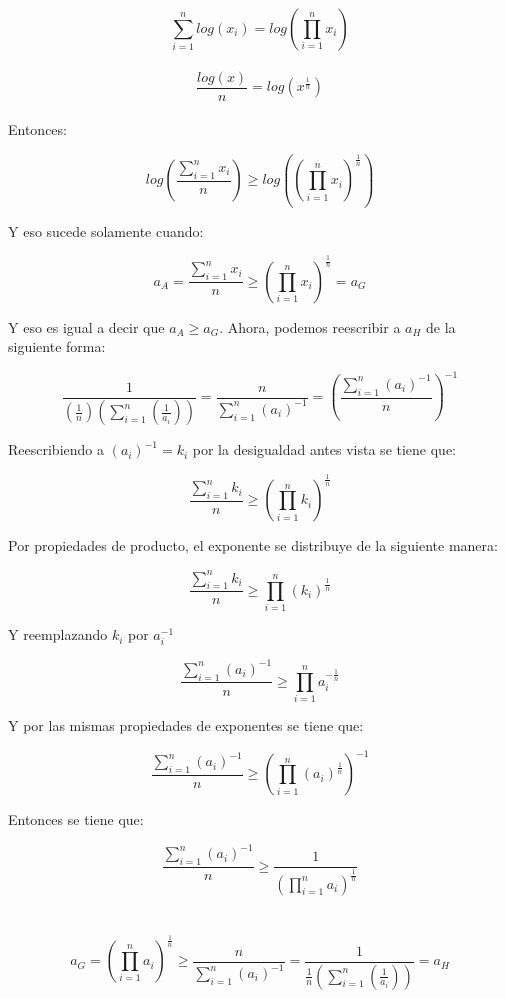 \documentclass[12pt,a4paper]{report}
\begin{document}
\begin{enumerate}
{		   $$\sum_{i=1}^{n}log(x_{i})=log(\prod_{i=1}^{n}x_{i})$$ \\
		      $$\frac{log(x)}{n}=log(x^{\frac{1}{n}})$$\\
		      Entonces:\\
		      \begin{center}
		     $$log(\frac{\sum_{i=1}^{n}x_{i}}{n})\geq log((\prod_{i=1}^{n}x_{i})^{\frac{1}{n}})
		      $$\end{center}
		      Y eso sucede solamente cuando:\\
		      \begin{center}
		          $$a_{A}=\frac{\sum_{i=1}^{n}x_{i}}{n} \geq (\prod_{i=1}^{n}x_{i})^{\frac{1}{n}}=a_{G}$$
		      \end{center}
		      Y eso es igual a decir que $a_{A}\geq a_{G}$. Ahora, podemos reescribir a $a_{H}$ de la siguiente forma:\\
		      \begin{center}
		          $$\frac{1}{(\frac{1}{n})(\sum_{i=1}^{n}(\frac{1}{a_{i}}))}=\frac{n}{\sum_{i=1}^{n}(a_{i})^{-1}}=(\frac{\sum_{i=1}^{n}(a_{i})^{-1}}{n})^{-1}$$
		      \end{center}
		      Reescribiendo a $(a_{i})^{-1}=k_{i}$ por la desigualdad antes vista se tiene que:\\
		      \begin{center}
		          $$\frac{\sum_{i=1}^{n}k_{i}}{n}\geq (\prod_{i=1}^{n}k_{i})^{\frac{1}{n}}$$
		      \end{center}
		      Por propiedades de producto, el exponente se distribuye de la siguiente manera:\\
		      \begin{center}
		          $$\frac{\sum_{i=1}^{n}k_{i}}{n}\geq \prod_{i=1}^{n}(k_{i})^{\frac{1}{n}}$$
		      \end{center}
		      Y reemplazando $k_{i}$ por $a_{i}^{-1}$\\
		      \begin{center}
		          $$\frac{\sum_{i=1}^{n}(a_{i})^{-1}}{n} \geq \prod_{i=1}^{n}a_{i}^{-\frac{1}{n}}$$
		      \end{center}
		      Y por las mismas propiedades de exponentes se tiene que:\\
		      \begin{center}
		          $$\frac{\sum_{i=1}^{n}(a_{i})^{-1}}{n}\geq (\prod_{i=1}^{n}(a_{i})^{\frac{1}{n}})^{-1}$$
		      \end{center}

		      Entonces se tiene que:\\
		      \begin{center}
		          $$\frac{\sum_{i=1}^{n}(a_{i})^{-1}}{n}\geq \frac{1}{(\prod_{i=1}^{n}a_{i})^{\frac{1}{n}}}$$\\ \\
		          $$a_{G}=(\prod_{i=1}^{n}a_{i})^{\frac{1}{n}}\geq \frac{n}{\sum_{i=1}^{n}(a_{i})^{-1}}=\frac{1}{\frac{1}{n}(\sum_{i=1}^{n}(\frac{1}{a_{i}}))}=a_{H}$$


\end{center}}
\end{enumerate}
\end{document}
